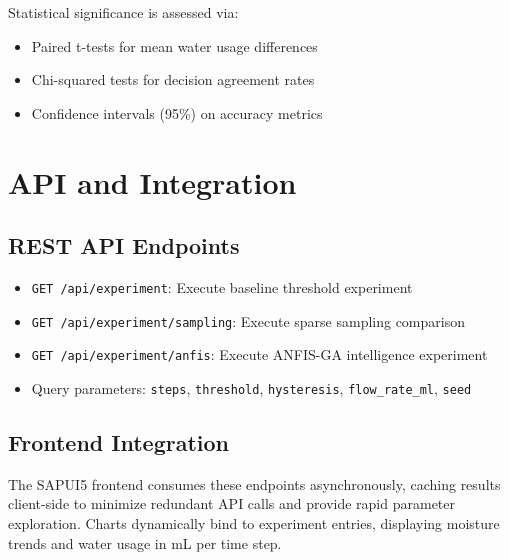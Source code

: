 Statistical significance is assessed via:
\begin{itemize}
    \item Paired t-tests for mean water usage differences
    \item Chi-squared tests for decision agreement rates
    \item Confidence intervals (95\%) on accuracy metrics
\end{itemize}

\section{API and Integration}

\subsection{REST API Endpoints}

\begin{itemize}
    \item \texttt{GET /api/experiment}: Execute baseline threshold experiment
    \item \texttt{GET /api/experiment/sampling}: Execute sparse sampling comparison
    \item \texttt{GET /api/experiment/anfis}: Execute ANFIS-GA intelligence experiment
    \item Query parameters: \texttt{steps}, \texttt{threshold}, \texttt{hysteresis}, \texttt{flow\_rate\_ml}, \texttt{seed}
\end{itemize}

\subsection{Frontend Integration}

The SAPUI5 frontend consumes these endpoints asynchronously, caching results client-side to minimize redundant API calls and provide rapid parameter exploration. Charts dynamically bind to experiment entries, displaying moisture trends and water usage in mL per time step.

